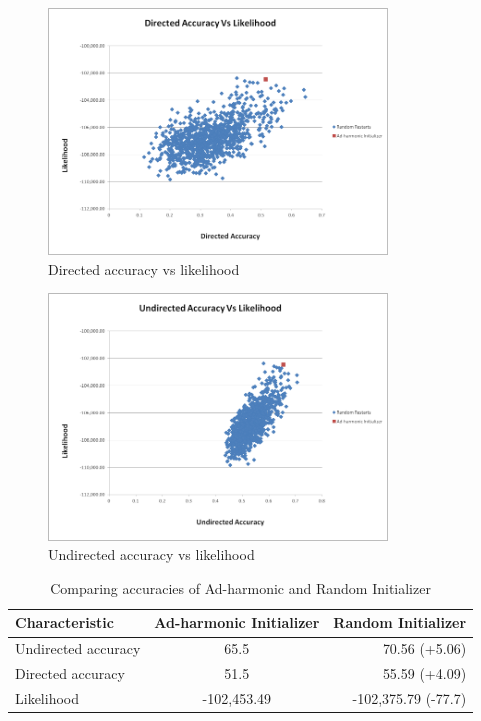 \documentclass{beamer}
\begin{document}
\begin{frame}

\begin{figure}
\centering
\includegraphics[width=90mm]{images/directed_accuracy.png}
\caption{Directed accuracy vs likelihood}
\label{overflow}
\end{figure}

\end{frame}


\begin{frame}

\begin{figure}
\centering
\includegraphics[width=90mm]{images/undirected_accuracy.png}
\caption{Undirected accuracy vs likelihood}
\label{overflow}
\end{figure}

\end{frame}

\begin{frame}
\begin{table}[htbp]
\begin{center}
\begin{tabular}{|l|c|r|}
\hline
\textbf{Characteristic} & \textbf{Ad-harmonic Initializer} & \textbf{Random Initializer}\\
\hline
Undirected accuracy &  65.5   &    70.56 (+5.06) \\
Directed accuracy &  51.5   &   55.59 (+4.09) \\
Likelihood &  -102,453.49   &  -102,375.79 (-77.7) \\
\hline
\end{tabular}
\end{center}
\caption{Comparing accuracies of Ad-harmonic and Random Initializer}
\end{table}

\end{frame}
\end{document}
